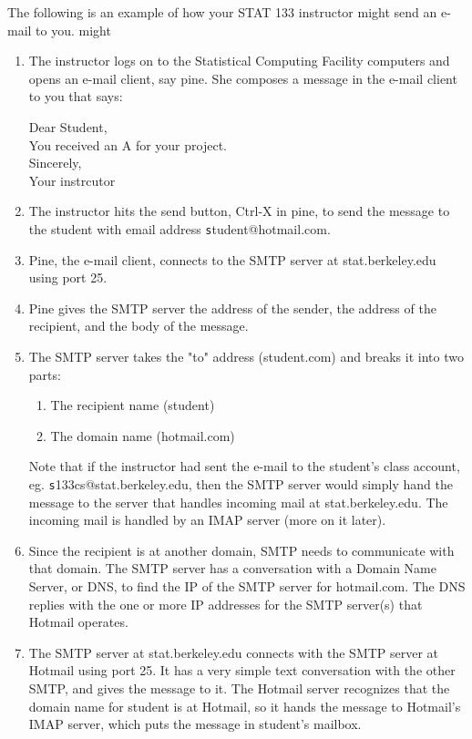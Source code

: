 The following is an example of how your STAT 133 instructor
might send an e-mail to you. might

\begin{enumerate}
\item The instructor logs on to the Statistical Computing Facility
computers and opens an e-mail client, say pine. 
She composes a message in the e-mail client to you that says:

 Dear Student, \\ 
   You received an A for your project.\\
 Sincerely,\\
 Your instrcutor 

\item The instructor hits the send button, Ctrl-X in pine, to send the message
to the student with email address {\texttt student@hotmail.com}.

\item Pine, the e-mail client, connects to the SMTP server at 
stat.berkeley.edu using port 25.

\item Pine gives the SMTP server the address of the
sender, the address of the recipient, 
and the body of the message.

\item The SMTP server takes the "to" address 
(student\@hotmail.com) and breaks it into two parts:

\begin{enumerate}
\item The recipient name (student)
\item The domain name (hotmail.com) 
\end{enumerate}

Note that if the instructor had sent the e-mail to the
student's class account, eg. {\texttt s133cs@stat.berkeley.edu},
then the SMTP server would simply hand the message 
to the server that handles incoming mail at 
stat.berkeley.edu.  The incoming mail is handled by an IMAP server 
(more on it later).

\item Since the recipient is at another domain, 
SMTP needs to communicate with that domain.
The SMTP server has a conversation with a 
Domain Name Server, or DNS, to find the IP of the 
SMTP server for hotmail.com. 
The DNS replies with the one or more IP addresses 
for the SMTP server(s) that Hotmail operates.

\item
The SMTP server at stat.berkeley.edu
connects with the SMTP server at Hotmail using port 25. 
It has a very simple text conversation with the other SMTP,
and gives the message to it. 
The Hotmail server recognizes that the domain name 
for student is at Hotmail, 
so it hands the message to Hotmail's IMAP server, 
which puts the message in student's mailbox. 
\end{enumerate}

